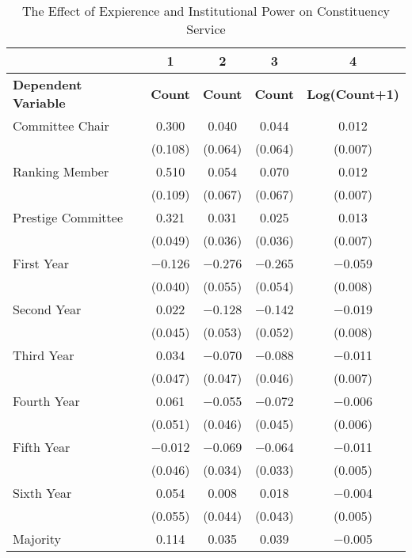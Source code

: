 \begin{table}

\caption{\label{tab:models_con}The Effect of Expierence and Institutional Power on Constituency Service}
\centering
\fontsize{11}{13}\selectfont
\begin{tabular}[t]{lcccc}
\toprule
  & 1 & 2 & 3 & 4\\
\midrule
\textbf{Dependent Variable} & \textbf{Count} & \textbf{Count} & \textbf{Count} & \textbf{Log(Count+1)}\\
\midrule
Committee Chair & \num{0.300} & \num{0.040} & \num{0.044} & \num{0.012}\\
 & (\num{0.108}) & (\num{0.064}) & (\num{0.064}) & (\num{0.007})\\
Ranking Member & \num{0.510} & \num{0.054} & \num{0.070} & \num{0.012}\\
 & (\num{0.109}) & (\num{0.067}) & (\num{0.067}) & (\num{0.007})\\
Prestige Committee & \num{0.321} & \num{0.031} & \num{0.025} & \num{0.013}\\
 & (\num{0.049}) & (\num{0.036}) & (\num{0.036}) & (\num{0.007})\\
First Year & \num{-0.126} & \num{-0.276} & \num{-0.265} & \num{-0.059}\\
 & (\num{0.040}) & (\num{0.055}) & (\num{0.054}) & (\num{0.008})\\
Second Year & \num{0.022} & \num{-0.128} & \num{-0.142} & \num{-0.019}\\
 & (\num{0.045}) & (\num{0.053}) & (\num{0.052}) & (\num{0.008})\\
Third Year & \num{0.034} & \num{-0.070} & \num{-0.088} & \num{-0.011}\\
 & (\num{0.047}) & (\num{0.047}) & (\num{0.046}) & (\num{0.007})\\
Fourth Year & \num{0.061} & \num{-0.055} & \num{-0.072} & \num{-0.006}\\
 & (\num{0.051}) & (\num{0.046}) & (\num{0.045}) & (\num{0.006})\\
Fifth Year & \num{-0.012} & \num{-0.069} & \num{-0.064} & \num{-0.011}\\
 & (\num{0.046}) & (\num{0.034}) & (\num{0.033}) & (\num{0.005})\\
Sixth Year & \num{0.054} & \num{0.008} & \num{0.018} & \num{-0.004}\\
 & (\num{0.055}) & (\num{0.044}) & (\num{0.043}) & (\num{0.005})\\
Majority & \num{0.114} & \num{0.035} & \num{0.039} & \num{-0.005}\\

\end{tabular}
\end{table}
